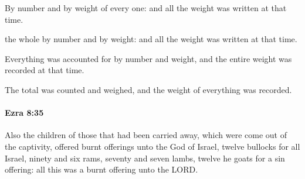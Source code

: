 			By number and by weight of every one: and all the weight was written at that time.

			\begin{versebox}
					\item[BHS] 
					\item[LXX] 
					\item[ASV] the whole by number and by weight: and all the weight was written at that time.
					\item[NIV] Everything was accounted for by number and weight, and the entire weight was recorded at that time.
					\item[NRSV] The total was counted and weighed, and the weight of everything was recorded.
			\end{versebox}

		\paragraph{Ezra 8:35} %
			\label{EZRA-8-35}

			Also the children of those that had been carried away, which were come out of the captivity, offered burnt offerings unto the God of Israel, twelve bullocks for all Israel, ninety and six rams, seventy and seven lambs, twelve he goats for a sin offering: all this was a burnt offering unto the LORD.

